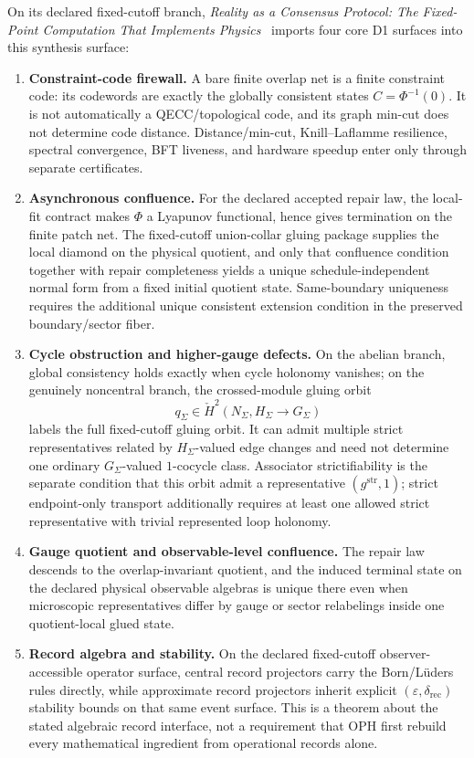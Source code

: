 On its declared fixed-cutoff branch, \emph{Reality as a Consensus Protocol: The Fixed-Point
Computation That Implements Physics}~\cite{ophconsensus} imports four core D1 surfaces into this
synthesis surface:
\begin{enumerate}[leftmargin=2em]
\item \textbf{Constraint-code firewall.} A bare finite overlap net is a finite constraint code:
its codewords are exactly the globally consistent states \(C=\Phi^{-1}(0)\). It is not
automatically a QECC/topological code, and its graph min-cut does not determine code distance.
Distance/min-cut, Knill--Laflamme resilience, spectral convergence, BFT liveness, and hardware
speedup enter only through separate certificates.
\item \textbf{Asynchronous confluence.} For the declared accepted repair law, the local-fit
contract makes \(\Phi\) a Lyapunov functional, hence gives termination on the finite patch net.
The fixed-cutoff union-collar gluing package supplies the local diamond on the physical quotient,
and only that confluence condition together with repair completeness yields a unique
schedule-independent normal form from a fixed initial quotient state. Same-boundary uniqueness
requires the additional unique consistent extension condition in the preserved boundary/sector
fiber.
\item \textbf{Cycle obstruction and higher-gauge defects.} On the abelian branch, global
consistency holds exactly when cycle holonomy vanishes; on the genuinely noncentral branch, the
crossed-module gluing orbit
\[
q_\Sigma \in \check H^2(N_\Sigma,H_\Sigma \to G_\Sigma)
\]
labels the full fixed-cutoff gluing orbit. It can admit multiple strict representatives related by
\(H_\Sigma\)-valued edge changes and need not determine one ordinary \(G_\Sigma\)-valued
\(1\)-cocycle class. Associator strictifiability is the separate condition that this orbit admit a
representative \((g^{\mathrm{str}},1)\); strict endpoint-only transport additionally requires at
least one allowed strict representative with trivial represented loop holonomy.
\item \textbf{Gauge quotient and observable-level confluence.} The repair law descends to the
overlap-invariant quotient, and the induced terminal state on the declared physical observable
algebras is unique there even when microscopic representatives differ by gauge or sector
relabelings inside one quotient-local glued state.
\item \textbf{Record algebra and stability.} On the declared fixed-cutoff observer-accessible
operator surface, central record projectors carry the Born/L\"uders rules directly, while
approximate record projectors inherit explicit \((\varepsilon,\delta_{\mathrm{rec}})\) stability
bounds on that same event surface. This is a theorem about the stated algebraic record interface,
not a requirement that OPH first rebuild every mathematical ingredient from operational records alone.
\end{enumerate}

